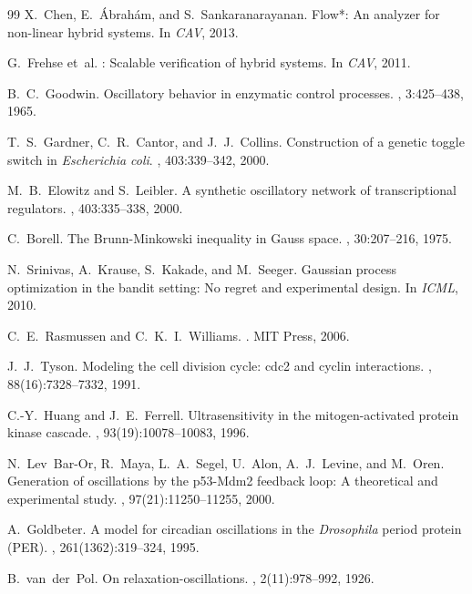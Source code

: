 \documentclass[11pt]{article}
\begin{document}
\begin{thebibliography}{99}
X.~Chen, E.~{\'A}brah{\'a}m, and S.~Sankaranarayanan.
\newblock Flow*: An analyzer for non-linear hybrid systems.
\newblock In {\em CAV}, 2013.

G.~Frehse et~al.
: Scalable verification of hybrid systems.
\newblock In {\em CAV}, 2011.

B.~C.~Goodwin.
\newblock Oscillatory behavior in enzymatic control processes.
, 3:425--438, 1965.

T.~S.~Gardner, C.~R.~Cantor, and J.~J.~Collins.
\newblock Construction of a genetic toggle switch in \emph{Escherichia coli}.
, 403:339--342, 2000.

M.~B.~Elowitz and S.~Leibler.
\newblock A synthetic oscillatory network of transcriptional regulators.
, 403:335--338, 2000.

C.~Borell.
\newblock The {B}runn-{M}inkowski inequality in {G}auss space.
, 30:207--216, 1975.

N.~Srinivas, A.~Krause, S.~Kakade, and M.~Seeger.
\newblock Gaussian process optimization in the bandit setting: No regret and experimental design.
\newblock In {\em ICML}, 2010.

C.~E.~Rasmussen and C.~K.~I.~Williams.
.
\newblock MIT Press, 2006.

J.~J.~Tyson.
\newblock Modeling the cell division cycle: cdc2 and cyclin interactions.
, 88(16):7328--7332, 1991.

C.-Y.~Huang and J.~E.~Ferrell.
\newblock Ultrasensitivity in the mitogen-activated protein kinase cascade.
, 93(19):10078--10083, 1996.

N.~Lev~Bar-Or, R.~Maya, L.~A.~Segel, U.~Alon, A.~J.~Levine, and M.~Oren.
\newblock Generation of oscillations by the p53-{M}dm2 feedback loop: A theoretical and experimental study.
, 97(21):11250--11255, 2000.

A.~Goldbeter.
\newblock A model for circadian oscillations in the \emph{Drosophila} period protein ({PER}).
, 261(1362):319--324, 1995.

B.~van~der~Pol.
\newblock On relaxation-oscillations.
, 2(11):978--992, 1926.

\end{thebibliography}
\end{document}
